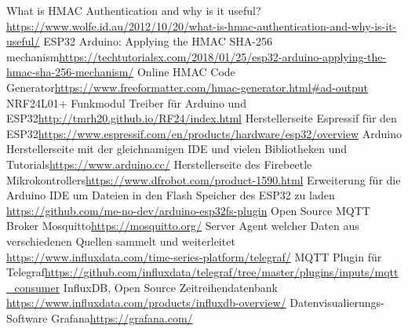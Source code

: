 \documentclass[
  12pt, %
  a4paper, %
  twoside, %
  openany, %
  numbers=noenddot, %
  BCOR=5mm, %
  parskip=half*, %
  thesis, %
]{bfhbook}
\begin{document}
\renewcommand\bibname{Linkverzeichnis}
\begin{thebibliography}{99}
   What is HMAC Authentication and why is it useful?\break \url{https://www.wolfe.id.au/2012/10/20/what-is-hmac-authentication-and-why-is-it-useful/}
    ESP32 Arduino: Applying the HMAC SHA-256 mechanism\break \url{https://techtutorialsx.com/2018/01/25/esp32-arduino-applying-the-hmac-sha-256-mechanism/}
    Online HMAC Code Generator\break \url{https://www.freeformatter.com/hmac-generator.html#ad-output}
    NRF24L01+ Funkmodul Treiber für Arduino und ESP32\break \url{http://tmrh20.github.io/RF24/index.html}
    Herstellerseite Espressif für den ESP32\break \url{https://www.espressif.com/en/products/hardware/esp32/overview}
    Arduino Herstellerseite mit der gleichnamigen IDE und vielen Bibliotheken und Tutorials\break \url{https://www.arduino.cc/}
    Herstellerseite des Firebeetle Mikrokontrollers\break \url{https://www.dfrobot.com/product-1590.html}
    Erweiterung für die Arduino IDE um Dateien in den Flash Speicher des ESP32 zu laden \break \url{https://github.com/me-no-dev/arduino-esp32fs-plugin}
    Open Source MQTT Broker Mosquitto\break \url{https://mosquitto.org/}
     Server Agent welcher Daten aus verschiedenen Quellen sammelt und weiterleitet \break \url{https://www.influxdata.com/time-series-platform/telegraf/}
    MQTT Plugin für Telegraf\break \url{https://github.com/influxdata/telegraf/tree/master/plugins/inputs/mqtt_consumer}
     InfluxDB, Open Source Zeitreihendatenbank \break \url{https://www.influxdata.com/products/influxdb-overview/}
     Datenvisualierungs-Software Grafana\break \url{https://grafana.com/}
  \end{thebibliography}
\end{document}
